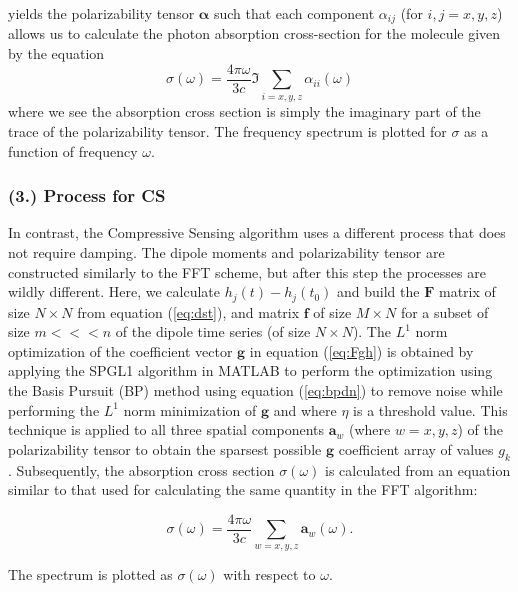 \documentclass[11pt]{article}
\begin{document}
yields the polarizability tensor $\mathbf{\alpha}$ such that each component $\alpha_{ij}$ (for $i,j = x,y,z$) allows us to calculate the photon absorption cross-section for the molecule given by the equation
\begin{equation}\label{eq:fftcross}
	\sigma(\omega) = \frac{4 \pi \omega}{3c}  \Im\sum_{i = x, y, z} \alpha_{ii}(\omega)
\end{equation}
where we see the absorption cross section is simply the imaginary part of the trace of the polarizability tensor.  The frequency spectrum is plotted for $\sigma$ as a function of frequency $\omega$.

\subsubsection*{(3.)	Process for CS}	%

\par In contrast, the Compressive Sensing algorithm uses a different process that does not require damping.  The dipole moments and polarizability tensor are constructed similarly to the FFT scheme, but after this step the processes are wildly different. Here, we calculate $h_{j}(t) - h_{j}(t_{0})$ and build the $\mathbf{F}$ matrix of size $N \times N$ from equation (\ref{eq:dst}), and matrix $\mathbf{f}$ of size $M \times N$  for a subset of size $m <<< n$ of the dipole time series (of size $N \times N$).  The $L^{1}$ norm optimization of the coefficient vector $\mathbf{g}$ in equation (\ref{eq:Fgh}) is obtained by applying the SPGL1 algorithm in MATLAB to perform the optimization using the Basis Pursuit (BP) method using equation (\ref{eq:bpdn}) to remove noise while performing the $L^{1}$ norm minimization of $\mathbf{g}$ and where $\eta$ is a threshold value. This technique is applied to all three spatial components $\mathbf{a}_{w}$ (where $w = x,y,z$) of the polarizability tensor to obtain the sparsest possible $\mathbf{g}$ coefficient array of values $g_{k}$.  Subsequently, the absorption cross section $\sigma(\omega)$ is calculated from an equation similar to that used for calculating the same quantity in the FFT algorithm:

\begin{equation}\label{eq:cscross}
	\sigma(\omega) = \frac{4\pi\omega}{3c}\sum_{w = x,y,z}\mathbf{a}_{w}(\omega).
\end{equation}

The spectrum is plotted as $\sigma(\omega)$ with respect to $\omega$.
\end{document}
